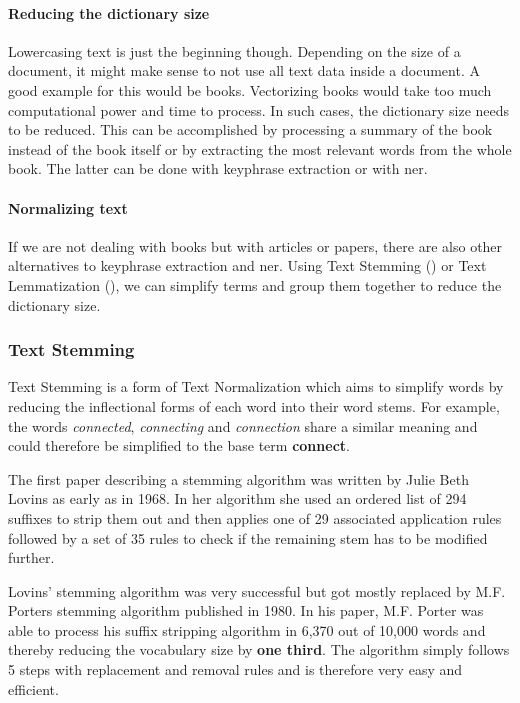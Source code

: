 \paragraph{Reducing the dictionary size}
Lowercasing text is just the beginning though.
Depending on the size of a document, it might make sense to not use all text data inside a document.
A good example for this would be books.
Vectorizing books would take too much computational power and time to process.
In such cases, the dictionary size needs to be reduced.
This can be accomplished by processing a summary of the book instead of the book itself
or by extracting the most relevant words from the whole book.
The latter can be done with keyphrase extraction or with \Gls{ner}.

\paragraph{Normalizing text}
If we are not dealing with books but with articles or papers,
there are also other alternatives to keyphrase extraction and \Gls{ner}.
Using Text Stemming ()
or Text Lemmatization (),
we can simplify terms and group them together to reduce the dictionary size.

\subsubsection{Text Stemming}
\label{subsubsec:3_text_stemming}

Text Stemming is a form of Text Normalization which aims to simplify words
by reducing the inflectional forms of each word into their word stems.
For example, the words \textit{connected}, \textit{connecting} and \textit{connection} share a similar meaning and could
therefore be simplified to the base term \textbf{connect}.

The first paper describing a stemming algorithm was written by Julie Beth Lovins\cite{LovinsStemmer}
as early as in 1968.
In her algorithm she used an ordered list of 294 suffixes to strip them out and then applies one of
29 associated application rules followed by a set of 35 rules to check if the remaining stem has to be
modified further.

Lovins' stemming algorithm was very successful but got mostly replaced by
M.F. Porters stemming algorithm\cite{PorterStemmerAlgorithm} published in 1980.
In his paper, M.F. Porter was able to process his suffix stripping algorithm in 6,370 out of 10,000 words and thereby
reducing the vocabulary size by \textbf{one third}.
The algorithm simply follows 5 steps with replacement and removal rules and is therefore very easy and efficient.


